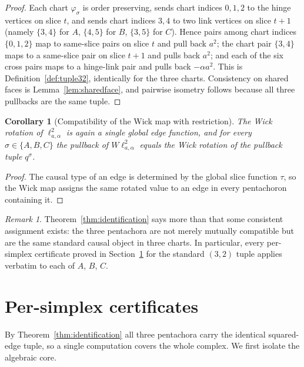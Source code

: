 \documentclass[11pt]{article}
\newtheorem{corollary}[theorem]{Corollary}
\theoremstyle{definition}
\theoremstyle{remark}
\newtheorem{remark}[theorem]{Remark}
\newcommand{\ltwo}{\ell^{2}_{a,\alpha}}
\newcommand{\Wick}{W}
\begin{document}
\begin{proof}
Each chart $\varphi_{\sigma}$ is order preserving, sends chart indices $0,1,2$ to the hinge vertices on slice $t$, and sends chart indices $3,4$ to two link vertices on slice $t+1$ (namely $\{3,4\}$ for $A$, $\{4,5\}$ for $B$, $\{3,5\}$ for $C$). Hence pairs among chart indices $\{0,1,2\}$ map to same-slice pairs on slice $t$ and pull back $a^{2}$; the chart pair $\{3,4\}$ maps to a same-slice pair on slice $t+1$ and pulls back $a^{2}$; and each of the six cross pairs maps to a hinge-link pair and pulls back $-\alpha a^{2}$. This is Definition~\ref{def:tuple32}, identically for the three charts. Consistency on shared faces is Lemma~\ref{lem:sharedface}, and pairwise isometry follows because all three pullbacks are the same tuple.
\end{proof}

\begin{corollary}[Compatibility of the Wick map with restriction]
\label{cor:wickcompat}
The Wick rotation of $\ltwo$ is again a single global edge function, and for every $\sigma\in\{A,B,C\}$ the pullback of $\Wick\ltwo$ equals the Wick rotation of the pullback tuple $q^{\sigma}$.
\end{corollary}

\begin{proof}
The causal type of an edge is determined by the global slice function $\tau$, so the Wick map assigns the same rotated value to an edge in every pentachoron containing it.
\end{proof}

\begin{remark}
Theorem~\ref{thm:identification} says more than that some consistent assignment exists: the three pentachora are not merely mutually compatible but are the same standard causal object in three charts. In particular, every per-simplex certificate proved in Section~\ref{sec:certificates} for the standard $(3,2)$ tuple applies verbatim to each of $A$, $B$, $C$.
\end{remark}

\section{Per-simplex certificates}
\label{sec:certificates}

By Theorem~\ref{thm:identification} all three pentachora carry the identical squared-edge tuple, so a single computation covers the whole complex. We first isolate the algebraic core.
\end{document}

